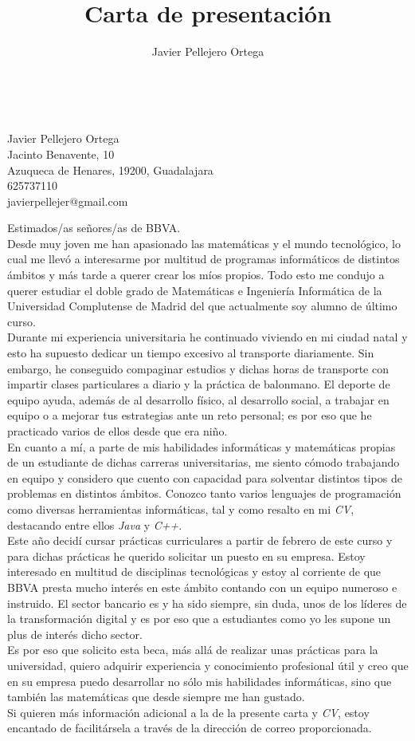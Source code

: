 \documentclass[11pt, oneside]{book}
\title{Carta de presentación}
\author{Javier Pellejero Ortega}
\begin{document}
\ \\
\begin{flushright}
Javier Pellejero Ortega\\
Jacinto Benavente, 10\\
Azuqueca de Henares, 19200, Guadalajara\\
625737110\\
javierpellejer@gmail.com\\
\end{flushright}

Estimados/as señores/as de BBVA.\\

Desde muy joven me han apasionado las matemáticas y el mundo tecnológico, lo cual me llevó a interesarme por multitud de programas informáticos de distintos ámbitos y más tarde a querer crear los míos propios. Todo esto me condujo a querer estudiar el doble grado de Matemáticas e Ingeniería Informática de la Universidad Complutense de Madrid del que actualmente soy alumno de último curso.\\

Durante mi experiencia universitaria he continuado viviendo en mi ciudad natal y esto ha supuesto dedicar un tiempo excesivo al transporte diariamente. Sin embargo, he conseguido compaginar estudios y dichas horas de transporte con impartir clases particulares a diario y la práctica de balonmano. El deporte de equipo ayuda, además de al desarrollo físico, al desarrollo social, a trabajar en equipo o a mejorar tus estrategias ante un reto personal; es por eso que he practicado varios de ellos desde que era niño.\\

En cuanto a mí, a parte de mis habilidades informáticas y matemáticas propias de un estudiante de dichas carreras universitarias, me siento cómodo trabajando en equipo y considero que cuento con capacidad para solventar distintos tipos de problemas en distintos ámbitos. Conozco tanto varios lenguajes de programación como diversas herramientas informáticas, tal y como resalto en mi \textit{CV}, destacando entre ellos \textit{Java} y \textit{C++}.\\

Este año decidí cursar prácticas curriculares a partir de febrero de este curso y para dichas prácticas he querido solicitar un puesto en su empresa. Estoy interesado en multitud de disciplinas tecnológicas y estoy al corriente de que BBVA presta mucho interés en este ámbito contando con un equipo numeroso e instruido. El sector bancario es y ha sido siempre, sin duda, unos de los líderes de la transformación digital y es por eso que a estudiantes como yo les supone un plus de interés dicho sector.\\

Es por eso que solicito esta beca, más allá de realizar unas prácticas para la universidad, quiero adquirir experiencia y conocimiento profesional útil y creo que en su empresa puedo desarrollar no sólo mis habilidades informáticas, sino que también las matemáticas que desde siempre me han gustado.\\

Si quieren más información adicional a la de la presente carta y \textit{CV}, estoy encantado de facilitársela a través de la dirección de correo proporcionada.
\end{document}
